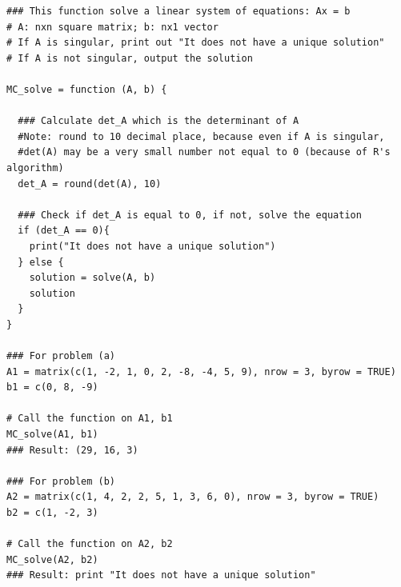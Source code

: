 \documentclass{article}
\begin{document}
\begin{lstlisting}[style=myRstyle]
### This function solve a linear system of equations: Ax = b
# A: nxn square matrix; b: nx1 vector
# If A is singular, print out "It does not have a unique solution"
# If A is not singular, output the solution 

MC_solve = function (A, b) {
  
  ### Calculate det_A which is the determinant of A
  #Note: round to 10 decimal place, because even if A is singular, 
  #det(A) may be a very small number not equal to 0 (because of R's algorithm)
  det_A = round(det(A), 10)
  
  ### Check if det_A is equal to 0, if not, solve the equation
  if (det_A == 0){
    print("It does not have a unique solution")
  } else {
    solution = solve(A, b)
    solution
  }
}

### For problem (a)
A1 = matrix(c(1, -2, 1, 0, 2, -8, -4, 5, 9), nrow = 3, byrow = TRUE)
b1 = c(0, 8, -9)

# Call the function on A1, b1
MC_solve(A1, b1)
### Result: (29, 16, 3)

### For problem (b)
A2 = matrix(c(1, 4, 2, 2, 5, 1, 3, 6, 0), nrow = 3, byrow = TRUE)
b2 = c(1, -2, 3)

# Call the function on A2, b2
MC_solve(A2, b2)
### Result: print "It does not have a unique solution"
\end{lstlisting}
\end{document}
